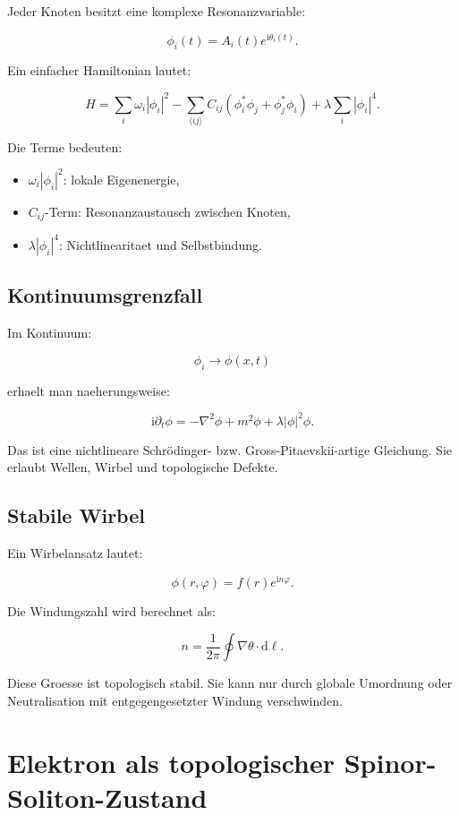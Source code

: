 \documentclass[11pt,a4paper]{article}
\newcommand{\dd}{\mathrm{d}}
\newcommand{\ii}{\mathrm{i}}
\begin{document}
Jeder Knoten besitzt eine komplexe Resonanzvariable:

\[
\phi_i(t)=A_i(t)e^{\ii\theta_i(t)}.
\]

Ein einfacher Hamiltonian lautet:

\[
H=
\sum_i \omega_i |\phi_i|^2
-
\sum_{\langle ij\rangle}
C_{ij}
(\phi_i^*\phi_j+\phi_j^*\phi_i)
+
\lambda\sum_i |\phi_i|^4.
\]

Die Terme bedeuten:
\begin{itemize}
  \item $\omega_i|\phi_i|^2$: lokale Eigenenergie,
  \item $C_{ij}$-Term: Resonanzaustausch zwischen Knoten,
  \item $\lambda|\phi_i|^4$: Nichtlinearitaet und Selbstbindung.
\end{itemize}

\subsection{Kontinuumsgrenzfall}

Im Kontinuum:

\[
\phi_i \rightarrow \phi(x,t)
\]

erhaelt man naeherungsweise:

\[
\ii\partial_t\phi
=
-\nabla^2\phi
+
m^2\phi
+
\lambda|\phi|^2\phi.
\]

Das ist eine nichtlineare Schrödinger- bzw. Gross-Pitaevskii-artige Gleichung. Sie erlaubt Wellen, Wirbel und
topologische Defekte.

\subsection{Stabile Wirbel}

Ein Wirbelansatz lautet:

\[
\phi(r,\varphi)=f(r)e^{\ii n\varphi}.
\]

Die Windungszahl wird berechnet als:

\[
n = \frac{1}{2\pi}\oint \nabla\theta\cdot \dd \ell.
\]

Diese Groesse ist topologisch stabil. Sie kann nur durch globale Umordnung oder Neutralisation mit entgegengesetzter
Windung verschwinden.

\section{Elektron als topologischer Spinor-Soliton-Zustand}
\end{document}
